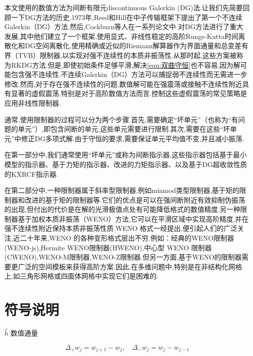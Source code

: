 \documentclass{book}
\begin{document}
本文使用的数值方法为间断有限元discontinuous Galerkin (DG)法.让我们先简要回顾一下DG方法的历史.1973年,Reed和Hill\cite{Reed_Hill}在中子传输框架下提出了第一个不连续Galerkin（DG）方法.然后,Cockburn等人在一系列论文中 \cite{RKDG2,RKDG3,RKDG4,RKDG5} 对DG方法进行了重大发展,其中他们建立了一个框架,使用显式、非线性稳定的高阶Runge-Kutta时间离散化和DG空间离散化,使用精确或近似的Riemann解算器作为界面通量和总变差有界（TVB）限制器\cite{TVB},以实现对强不连续性的本质非振荡性.从那时起,这些方案被称为RKDG方法.但是,即使初始条件足够平滑,解决\eqref{equ:双曲守恒}也不容易,因为解可能包含强不连续性.不连续Galerkin（DG）方法可以捕捉弱不连续性而无需进一步修改.然而,对于存在强不连续性的问题,数值解可能在强震荡或接触不连续性附近具有显著的虚假震荡,特别是对于高阶数值方法而言.控制这些虚假震荡的常见策略是应用非线性限制器.

通常,使用限制器的过程可以分为两个步骤.首先,需要确定“坏单元”（也称为“有问题的单元”）,即包含间断的单元,这些单元需要进行限制.其次,需要在这些“坏单元”中修正DG多项式解.由于守恒的要求,需要保证单元平均值不变,并且减小振荡.

在第一部分中,我们通常使用“坏单元”或称为间断指示器,这些指示器包括基于最小模型的指示器\cite{RKDG2}、基于力矩的指示器\cite{基于力矩的指示器}、改进的力矩指示器\cite{改进的基于矩的限制器}、以及基于DG超收敛性质的KXRCF指示器\cite{基于DG超收敛性质的KXRCF指示器}.

在第二部分中,一种限制器属于斜率型限制器,例如minmod类型限制器\cite{RKDG2,RKDG3,RKDG4,RKDG5},基于矩的限制器\cite{基于矩的限制器}和改进的基于矩的限制器\cite{改进的基于矩的限制器}等.它们的优点是可以在强间断附近有效抑制伪振荡的出现,但付出的代价是在解的光滑极值点处有可能降低格式的数值精度.另一种限制器基于加权本质非振荡（WENO）方法\cite{WENO1,WENO2,WENO3,WENO4,WENO5},它可以在平滑区域中实现高阶精度,并在强不连续性附近保持本质非振荡性质.WENO 格式一经提出,便引起人们的广泛关注,近二十年来,WENO 的各种变形格式层出不穷.例如：经典的WENO限制器(WENO-js)\cite{WENO-js1,WENO-js2},Hermite WENO限制器(HWENO)\cite{HWENO1,HWENO2},中心型 WENO 限制器(CWENO)\cite{CWENO},WENO-M限制器\cite{WENO-M},WENO-Z限制器\cite{WENO-Z}.但另一方面,基于WENO的限制器需要更广泛的空间模板来获得高阶方案.因此,在多维问题中,特别是在非结构化网格上,如三角形网格或四面体网格中实现它们是困难的.

\section{符号说明}
$\hat{h}$ 数值通量

\begin{equation}
    \Delta_{+} w_{j}=w_{j+1}-w_{j}, \quad \Delta_{-} w_{j}=w_{j}-w_{j-1}
\end{equation}
\end{document}
